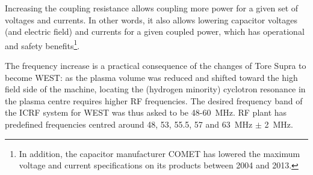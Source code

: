 Increasing the coupling resistance allows coupling more power for a given set of voltages and currents. In other words, it also allows lowering capacitor voltages (and electric field) and currents for a given coupled power, which has operational and safety benefits\footnote{In addition, the capacitor manufacturer COMET has lowered the maximum voltage and current specifications on its products between 2004 and 2013.}. 

The frequency increase is a practical consequence of the changes of Tore Supra to become WEST: as the plasma volume was reduced and  shifted toward the high field side of the machine, locating the (hydrogen minority) cyclotron resonance in the plasma centre requires higher RF frequencies. The desired frequency band of the ICRF system for WEST was thus asked to be 48-60~MHz. RF plant has predefined frequencies centred around 48, 53, 55.5, 57 and 63~MHz $\pm$ 2~MHz.
 
